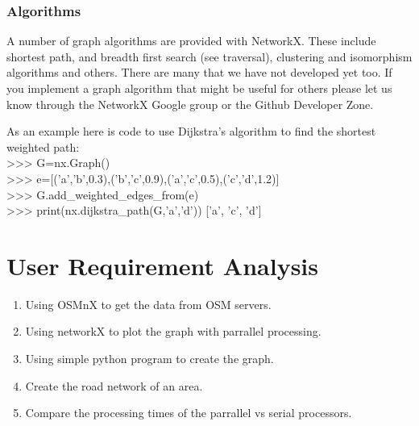 \subsubsection{Algorithms}
A number of graph algorithms are provided with NetworkX. These include shortest path, and breadth first search (see traversal), clustering and isomorphism algorithms and others. There are many that we have not developed yet too. If you implement a graph algorithm that might be useful for others please let us know through the NetworkX Google group or the Github Developer Zone.

As an example here is code to use Dijkstra’s algorithm to find the shortest weighted path:\\
>>> G=nx.Graph()\\
>>> e=[('a','b',0.3),('b','c',0.9),('a','c',0.5),('c','d',1.2)]\\
>>> G.add_weighted_edges_from(e)\\
>>> print(nx.dijkstra_path(G,'a','d'))
['a', 'c', 'd']\\


\section{User Requirement Analysis}
\begin{enumerate}
	\item Using OSMnX to get the data from OSM servers.
	\item Using networkX to plot the graph with parrallel processing.
	\item Using simple python program to create the graph. 
	\item Create the road network of an area.
	\item Compare the processing times of the parrallel vs serial processors. 
\end{enumerate}
